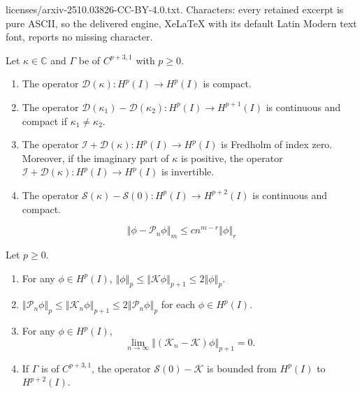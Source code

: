 \documentclass[10pt,a4paper]{amsart}
\newcommand{\norm}[1]{\left\Vert#1\right\Vert}
\begin{document}
licenses/arxiv-2510.03826-CC-BY-4.0.txt. Characters: every retained excerpt is pure ASCII, so the delivered engine, XeLaTeX with its default Latin Modern text font, reports no missing character.
	\begin{theorem}\label{thm:Sec2}
		Let $\kappa \in \mathbb C$ and $\Gamma$ be of $C^{p+3,1}$ with $p\geq 0$. 
		\begin{enumerate}
			\item[\rm (i)] The operator $\mathcal{D}(\kappa): H^{p}(I)\to H^{p}(I)$ is compact.
			\item[\rm(ii)] The operator $\mathcal{D}(\kappa_1)-\mathcal{D}(\kappa_2): H^{p}(I)\to H^{p+1}(I) $ is continuous and compact if $\kappa_1\neq\kappa_2$.
			\item[\rm(iii)] The operator $\mathcal{I}+\mathcal{D}(\kappa): H^{p}(I)\to H^{p}(I) $ is Fredholm of index zero. Moreover, if the imaginary part of $\kappa$ is positive, the operator $\mathcal{I}+\mathcal{D}(\kappa): H^{p}(I)\to H^{p}(I) $ is invertible.
			\item[\rm(iv)] The operator $\mathcal{S}(\kappa)-\mathcal{S}(0): H^{p}(I)\to H^{p+2}(I) $ is continuous and compact.
		\end{enumerate}
	\end{theorem}

	\begin{equation}\label{sec3:proj}
		\norm{\phi-\mathcal{P}_n\phi}_m\leq cn^{m-r}\norm{\phi}_r
	\end{equation}

	\begin{lemma}\label{sec3:lem1}
		Let  $p\geq0$.
				\begin{enumerate}
			\item[\rm (i)]For any $\phi\in H^{p}(I)$, $\norm{\phi}_{p}\leq\norm{\mathcal{K}\phi}_{p+1}\leq 2\norm{\phi}_{p}$. 
			\item[\rm(ii)] $\norm{\mathcal{P}_n\phi}_{p}\leq\norm{\mathcal{K}_n\phi}_{p+1}\leq 2\norm{\mathcal{P}_n\phi}_{p}$ for each $\phi\in H^{p}(I)$.
			\item[\rm(iii)] For any $\phi\in H^{p}(I)$,
			$$\lim_{n\to\infty}\norm{(\mathcal{K}_n-\mathcal{K})\phi}_{p+1}=0.$$
			\item[\rm(iv)] If $\Gamma$ is of $C^{p+3,1}$,
			the operator $\mathcal{S}(0)-\mathcal{K}$ is bounded from $H^{p}(I)$ to $H^{p+2}(I)$.
		\end{enumerate}
	\end{lemma}	
\end{document}
